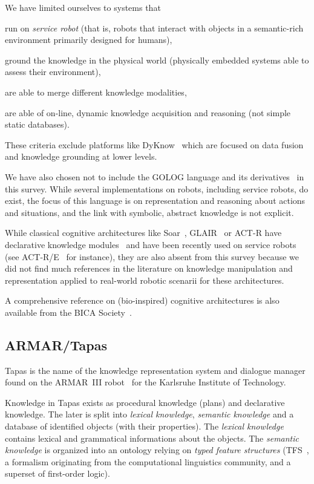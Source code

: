 We have limited ourselves to systems that
\begin{inparaenum} 
    \item  run on \emph{service robot} (that is, robots that interact with 
    objects in a semantic-rich environment primarily designed for humans),
    \item  ground the knowledge in the physical world (physically embedded
    systems able to assess their environment),
    \item  are able to merge different knowledge modalities,
    \item  are able of on-line, dynamic knowledge acquisition and reasoning 
    (\ie not simple static databases).
\end{inparaenum}

These criteria exclude platforms like {\sc DyKnow}~\cite{Heintz2004}
which are focused on data fusion and knowledge grounding at lower levels.

We have also chosen not to include the GOLOG language and its
derivatives~\cite{Levesque1997, Ferrein2008, Gspandl2011} in this survey. While
several implementations on robots, including service robots, do exist, the
focus of this language is on representation and reasoning about actions and
situations, and the link with symbolic, abstract knowledge is not explicit.

While classical cognitive architectures like {\sc Soar}~\cite{Lehman2006},
GLAIR~\cite{Shapiro2009} or {\sc ACT-R} have declarative knowledge
modules~\cite{Derbinsky2010} and have been recently used on service robots (see
{\sc ACT-R/E}~\cite{Kennedy2009} for instance), they are also absent from this
survey because we did not find much references in the literature on knowledge
manipulation and representation applied to real-world robotic scenarii for
these architectures.

A comprehensive reference on (bio-inspired) cognitive architectures is also
available from the BICA Society~\cite{BicaCogArch2011}.

\subsection{ARMAR/Tapas}

{\sc Tapas} is the name of the knowledge representation system and dialogue
manager found on the ARMAR~III robot~\cite{Holzapfel2008} for the Karlsruhe
Institute of Technology.

Knowledge in {\sc Tapas} exists as procedural knowledge (plans) and declarative
knowledge. The later is split into \emph{lexical knowledge}, \emph{semantic
knowledge} and a database of identified objects (with their properties). The
\emph{lexical knowledge} contains lexical and grammatical informations about
the objects. The \emph{semantic knowledge} is organized into an ontology
relying on \emph{typed feature structures} (TFS~\cite{Carpenter1992}, a
formalism originating from the computational linguistics community, and a
superset of first-order logic).

